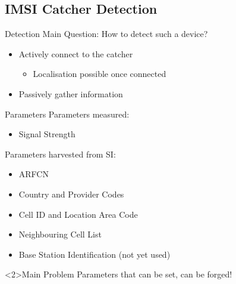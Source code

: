 \documentclass{beamer}
\begin{document}
\subsection{IMSI Catcher Detection}
\begin{frame}{Detection}
Main Question: How to detect such a device?
\begin{itemize}
	\item<1-> Actively connect to the catcher
	\begin{itemize}
		\item<1-> Localisation possible once connected
	\end{itemize}
	\item<1-> Passively gather information
\end{itemize}
\vspace{.8cm}
\end{frame}

\begin{frame}{Parameters}
Parameters measured:
\begin{itemize}
	\item Signal Strength
\end{itemize}
\vspace{.3cm}
Parameters harvested from SI:
\begin{itemize}
	\item ARFCN
	\item Country and Provider Codes
	\item Cell ID and Location Area Code
	\item Neighbouring Cell List
	\item Base Station Identification (not yet used)
\end{itemize}
\begin{alertblock}<2>{Main Problem}
Parameters that can be set, can be forged!
\end{alertblock}
\end{frame}
\end{document}
